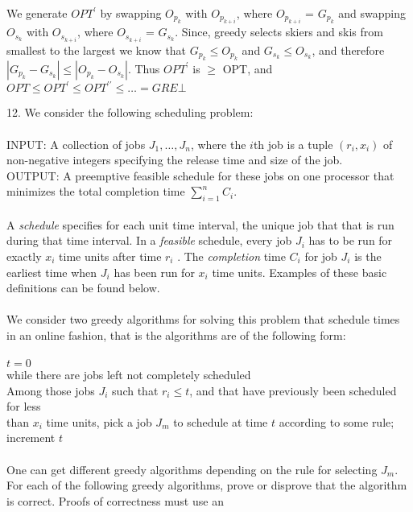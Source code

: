 \documentclass[10pt]{article}
\newcommand{\tab}{\hspace*{2em}}
\begin{document}
\begin{enumerate}
		We generate $OPT^{\prime}$ by swapping $O_{p_{k}}$ with $O_{p_{k+i}}$, where $O_{p_{k+i}}$ = $G_{p_{k}}$ and swapping $O_{s_{k}}$ 
		with $O_{s_{k+i}}$, where $O_{s_{k+i}}$ = $G_{s_{k}}$. Since, greedy selects skiers and skis from smallest to the largest we know
		that $G_{p_{k}} \leq O_{p_{k}}$ and $G_{s_{k}} \leq O_{s_{k}}$, and therefore $|G_{p_{k}} - G_{s_{k}}| \leq |O_{p_{k}} - O_{s_{k}}|$.
		Thus $OPT^{\prime}$ is $\geq$ OPT, and $OPT \leq OPT^{\prime} \leq OPT^{\prime\prime} \leq \ldots = GRE \bot$
	\end{enumerate}
	12.  We consider the following scheduling problem:\\
	\\
	INPUT: A collection of jobs $J_{1}, \ldots , J_{n}$, where the $i$th job is a tuple $(r_{i}, x_{i})$ of non-negative integers
	specifying the release time and size of the job.\\
	OUTPUT: A preemptive feasible schedule for these jobs on one processor that minimizes the total completion time 
	$\sum_{i=1}^n C_{i}$.\\
	\\
	A \textit{schedule} specifies for each unit time interval, the unique job that that is run during that time interval.
	In a \textit{feasible} schedule, every job $J_{i}$ has to be run for exactly $x_{i}$ time units after time $r_{i}$ . The \textit{completion}
	time $C_{i}$ for job $J_{i}$ is the earliest time when $J_{i}$ has been run for $x_{i}$ time units. Examples of these basic
	definitions can be found below.\\
	\\
	We consider two greedy algorithms for solving this problem that schedule times in an online fashion,
	that is the algorithms are of the following form:\\
	\\
	$t = 0$\\
	while there are jobs left not completely scheduled\\
	\tab Among those jobs $J_{i}$ such that $r_{i} \leq t$, and that have previously been scheduled for less\\
	\tab \tab than $x_{i}$ time units, pick a job $J_{m}$ to schedule at time $t$ according to some rule;\\
	\tab increment $t$\\
	\\
	One can get different greedy algorithms depending on the rule for selecting $J_{m}$. For each of the following
	greedy algorithms, prove or disprove that the algorithm is correct.  Proofs of correctness must use an
\end{document}
